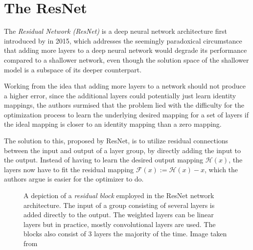 \section{The ResNet}
\label{sec:resnet}

The \emph{Residual Network (ResNet)} is a deep neural network architecture first introduced by  in 2015, which addresses the seemingly paradoxical circumstance that adding more layers to a deep neural network would degrade its performance compared to a shallower network, even though the solution space of the shallower model is a subspace of its deeper counterpart. 

Working from the idea that adding more layers to a network should not produce a higher error, since the additional layers could potentially just learn identity mappings, the authors surmised that the problem lied with the difficulty for the optimization process to learn the underlying desired mapping for a set of layers if the ideal mapping is closer to an identity mapping than a zero mapping.

The solution to this, proposed by ResNet, is to utilize residual connections between the input and output of a layer group, by directly adding the input to the output. 
Instead of having to learn the desired output mapping $\mathcal{H}(x)$, the layers now have to fit the residual mapping $\mathcal{F}(x) := \mathcal{H}(x) - x$, which the authors argue is easier for the optimizer to do.

\begin{figure}[htbp]
    \caption{A depiction of a \emph{residual block} employed in the ResNet network architecture. The input of a group consisting of several layers is added directly to the output. The weighted layers can be linear layers but in practice, mostly convolutional layers are used. The blocks also consist of 3 layers the majority of the time. Image taken from \cite{heDeepResidualLearning2015}}
    \label{fig:resblock}
\end{figure}

